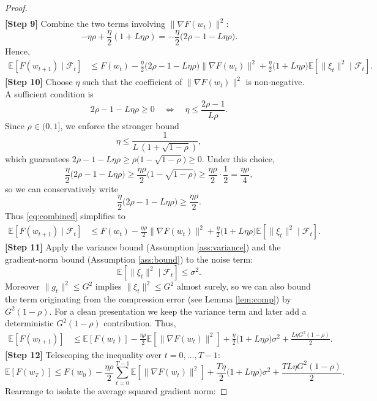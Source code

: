 \documentclass{article}
\newcommand{\E}{\mathbb{E}}
\begin{document}
\begin{proof}
\begin{align}
\end{align}
\textbf{[Step 9]}   Combine the two terms involving $\|\nabla F(w_t)\|^2$:
\[
-\eta\rho + \frac{\eta}{2}(1+L\eta\rho)
= -\frac{\eta}{2}\big(2\rho-1-L\eta\rho\big).
\]
Hence,
\begin{align}
\E[F(w_{t+1})\mid\mathcal{F}_t]
&\le F(w_t)
   -\frac{\eta}{2}\big(2\rho-1-L\eta\rho\big)\|\nabla F(w_t)\|^2
   +\frac{\eta}{2}\big(1+L\eta\rho\big)\E[\|\xi_t\|^2\mid\mathcal{F}_t]. \label{eq:combined}
\end{align}
\textbf{[Step 10]}   Choose $\eta$ such that the coefficient of $\|\nabla F(w_t)\|^2$ is non‑negative.  
A sufficient condition is
\[
2\rho-1-L\eta\rho\ge0\quad\Longleftrightarrow\quad 
\eta\le\frac{2\rho-1}{L\rho}.
\]
Since $\rho\in(0,1]$, we enforce the stronger bound
\[
\eta\le\frac{1}{L\,(1+\sqrt{1-\rho})},
\]
which guarantees $2\rho-1-L\eta\rho\ge\rho\big(1-\sqrt{1-\rho}\big)\ge0$.
Under this choice,
\[
\frac{\eta}{2}\big(2\rho-1-L\eta\rho\big)\ge\frac{\eta\rho}{2}\big(1-\sqrt{1-\rho}\big)\ge\frac{\eta\rho}{2}\cdot\frac{1}{2}=\frac{\eta\rho}{4},
\]
so we can conservatively write
\[
\frac{\eta}{2}\big(2\rho-1-L\eta\rho\big)\ge\frac{\eta\rho}{2}.
\]
Thus \eqref{eq:combined} simplifies to
\begin{align}
\E[F(w_{t+1})\mid\mathcal{F}_t]
&\le F(w_t)-\frac{\eta\rho}{2}\|\nabla F(w_t)\|^2
   +\frac{\eta}{2}\big(1+L\eta\rho\big)\E[\|\xi_t\|^2\mid\mathcal{F}_t]. \label{eq:final_one_step}
\end{align}
\textbf{[Step 11]}   Apply the variance bound (Assumption \ref{ass:variance}) and the gradient‑norm bound (Assumption \ref{ass:bound}) to the noise term:
\[
\E[\|\xi_t\|^2\mid\mathcal{F}_t]\le\sigma^2.
\]
Moreover $\|g_t\|^2\le G^2$ implies $\|\xi_t\|^2\le G^2$ almost surely, so we can also bound the term originating from the compression error (see Lemma \ref{lem:comp}) by $G^2(1-\rho)$.  For a clean presentation we keep the variance term and later add a deterministic $G^2(1-\rho)$ contribution.
Thus,
\begin{align}
\E[F(w_{t+1})]
&\le \E[F(w_t)]-\frac{\eta\rho}{2}\E[\|\nabla F(w_t)\|^2]
   +\frac{\eta}{2}\big(1+L\eta\rho\big)\sigma^2
   +\frac{L\eta G^2(1-\rho)}{2}. \label{eq:after_expect}
\end{align}
\textbf{[Step 12]}   Telescoping the inequality over $t=0,\dots,T-1$:
\[
\E[F(w_T)]\le F(w_0)-\frac{\eta\rho}{2}\sum_{t=0}^{T-1}\E[\|\nabla F(w_t)\|^2]
   +\frac{T\eta}{2}\big(1+L\eta\rho\big)\sigma^2
   +\frac{TL\eta G^2(1-\rho)}{2}.
\]
Rearrange to isolate the average squared gradient norm:

\end{proof}
\end{document}
